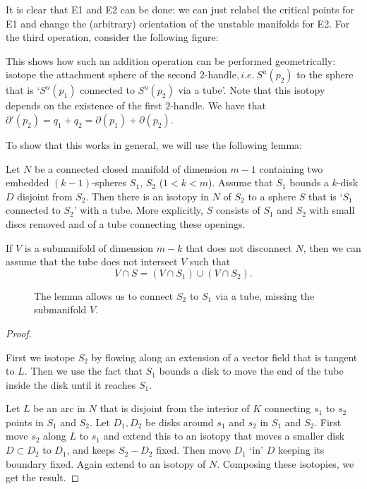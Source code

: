 It is clear that E1 and E2 can be done: we can just relabel the critical points for E1 and change the (arbitrary) orientation of the unstable manifolds for E2.
For the third operation, consider the following figure:

\begin{figure}[H]
    \centering
\end{figure}
This shows how such an addition operation can be performed geometrically: isotope the attachment sphere of the second $2$-handle$, i.e.\ S^{u}(p_2)$ to the sphere that is `$S^{u}(p_1)$ connected to $S^{u}(p_2)$ via a tube'. Note that this isotopy depends on the existence of the first $2$-handle.
We have that $\partial'(p_2) = q_1 + q_2 = \partial(p_1) + \partial(p_2)$.

To show that this works in general, we will use the following lemma:
\begin{lemma}
    Let $N$ be a connected closed manifold of dimension $m-1$ containing two embedded $(k-1)$-spheres $ S_1$, $S_2$ ($1 < k < m$).
    Assume that $S_1$ bounds a $k$-disk $D$  disjoint from $ S_2$. Then there is an isotopy in $N$ of  $ S_2$ to a sphere $S$ that is `$S_1$ connected to $ S_2$' with a tube.
    More explicitly, $S$ consists of $S_1$ and $ S_2$ with small discs removed and of a tube connecting these openings.

    If $V$ is a submanifold of dimension $m-k$ that does not disconnect $N$,  then we can assume that the tube does not intersect $V$ such that
     \[
         V \cap S = (V \cap S_1) \cup (V \cap S_2)
    .\] 
\end{lemma}
\begin{figure}[H]
    \centering
    \caption{The lemma allows us to connect $S_2$ to  $S_1$ via a tube, missing the submanifold $V$.}
    \label{fig:lemma-sphere-connect-with-tube}
\end{figure}
\begin{proof}
    \begin{marginfigure}
        \centering
        \caption{
            First we isotope $S_2$ by flowing along an extension of a vector field that is tangent to $L$.
            Then we use the fact that  $S_1$ bounds a disk to move the end of the tube inside the disk until it reaches $S_1$.
        }
        \label{fig:lemma-sphere-connect-with-tube-proof}
    \end{marginfigure}
    Let $L$ be an arc in $N$ that is disjoint from  the interior of $K$ connecting  $s_1$ to $s_2$ points in $S_1$ and $S_2$.
    Let $D_1, D_2$ be disks around $s_1$ and $ s_2$ in $ S_1$ and $S_2$.
    First move $s_2$ along $L$ to  $ s_1$ and extend this to an isotopy that moves a smaller disk $D \subset D_2$ to $D_1$, and keeps $ S_2 - D_2$ fixed.
    Then move $D_1$ `in' $D$ keeping its boundary fixed. Again extend to an isotopy of $N$.
    Composing these isotopies, we get the result.
\end{proof}

